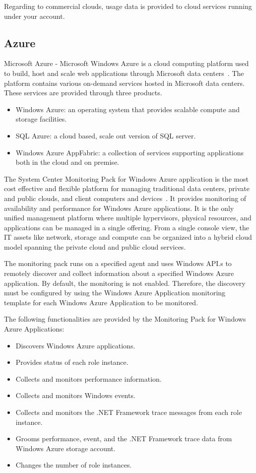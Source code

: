 \documentclass{sig-alternate-05-2015}
\begin{document}
Regarding to commercial clouds, usage data is provided to cloud services running under your account.

\subsection{Azure}

Microsoft Azure - Microsoft Windows Azure is a cloud computing platform used to build, host and scale web applications through Microsoft data centers~\cite{azure11}. The platform contains various on-demand services hosted in Microsoft data centers. These services are provided through three products.

\begin{itemize}
 \item Windows Azure: an operating system that provides scalable compute and storage facilities.
 \item SQL Azure: a cloud based, scale out version of SQL server.
 \item Windows Azure AppFabric: a collection of services supporting applications both in the cloud and on premise.
\end{itemize}

The System Center Monitoring Pack for Windows Azure application is the most cost effective and flexible platform for managing traditional data centers, private and public clouds, and client computers and devices~\cite{MonitoringPackAzure11}. It provides monitoring of availability and performance for Windows Azure applications. It is the only unified management platform where multiple hypervisors, physical resources, and applications can be managed in a single offering. From a single console view, the IT assets like network, storage and compute can be organized into a hybrid cloud model spanning the private cloud and public cloud services.

The monitoring pack runs on a specified agent and uses Windows API.s to remotely discover and collect information about a specified Windows Azure application. By default, the monitoring is not enabled. Therefore, the discovery must be configured by using the Windows Azure Application monitoring template for each Windows Azure Application to be monitored.

The following functionalities are provided by the Monitoring Pack for Windows Azure Applications:

\begin{itemize}
 \item Discovers Windows Azure applications.
 \item Provides status of each role instance.
 \item Collects and monitors performance information.
 \item Collects and monitors Windows events.
 \item Collects and monitors the .NET Framework trace messages from each role instance.
 \item Grooms performance, event, and the .NET Framework trace data from Windows Azure storage account.
 \item Changes the number of role instances.
\end{itemize}
\end{document}
